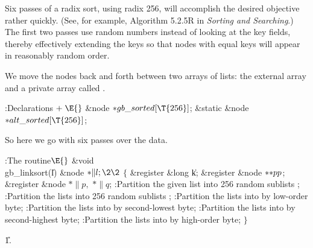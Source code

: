 Six passes of a radix sort, using radix 256, will accomplish the desired
objective rather quickly. (See, for example, Algorithm 5.2.5R in
{\sl Sorting and Searching}.) The first two passes use random numbers instead
of looking at the key fields, thereby effectively extending the keys
so that nodes with equal keys will appear in reasonably random order.

We move the nodes back and forth between two arrays of lists: the external
array  and a private array called .

\Y\B\4:Declarations\X${}\mathrel+\E{}$\6
\&{node} ${}{*}\\{gb\_sorted}[\T{256}]{}$;\6
\&{static} \&{node} ${}{*}\\{alt\_sorted}[\T{256}]{}$;\par
\fi

So here we go with six passes over the data.

\Y\B\4:The  routine\X${}\E{}$\6
\1\1\&{void} \\{gb\_linksort}(\|l)\6
\&{node} ${}{*}\|l;\2\2{}$\6
${}\{{}$\5
\1\&{register} \&{long} \|k;\6
\&{register} \&{node} ${}{*}{*}\\{pp}{}$;\6
\&{register} \&{node} ${}{*}\|p,{}$ ${}{*}\|q{}$;\7
:Partition the given list into 256 random sublists \X;\6
:Partition the  lists into 256 random sublists \X;\6
:Partition the  lists into  by
low-order byte\X;\6
:Partition the  lists into  by
second-lowest byte\X;\6
:Partition the  lists into  by
second-highest byte\X;\6
:Partition the  lists into  by
high-order byte\X;\6
\4${}\}{}$\2\par
\U1.\fi


